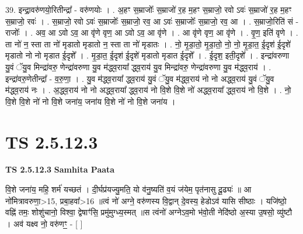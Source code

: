 \documentclass[17pt]{extarticle}
\begin{document}
39. इन्द्रा॒वरु॑णयो॒रितीन्द्रा᳚ - वरु॑णयोः । . अ॒हꣳ स॒म्राजोः᳚ स॒म्राजो॑ र॒ह म॒हꣳ स॒म्राजो॒ रवो ऽवः॑ स॒म्राजो॑ र॒ह म॒हꣳ स॒म्राजो॒ रवः॑ । . स॒म्राजो॒ रवो ऽवः॑ स॒म्राजोः᳚ स॒म्राजो॒ रव॒ आ ऽवः॑ स॒म्राजोः᳚ स॒म्राजो॒ रव॒ आ । . स॒म्राजो॒रिति॑ सं - राजोः᳚ । . अव॒ आ ऽवो ऽव॒ आ वृ॑णे वृण॒ आ ऽवो ऽव॒ आ वृ॑णे । . आ वृ॑णे वृण॒ आ वृ॑णे । . वृ॒ण॒ इति॑ वृणे । . ता नो॑ न॒ स्ता ता नो॑ मृडातो मृडातो न॒ स्ता ता नो॑ मृडातः । . नो॒ मृ॒डा॒तो॒ मृ॒डा॒तो॒ नो॒ नो॒ मृ॒डा॒त॒ ई॒दृश॑ ई॒दृशे॑ मृडातो नो नो मृडात ई॒दृशे᳚ । . मृ॒डा॒त॒ ई॒दृश॑ ई॒दृशे॑ मृडातो मृडात ई॒दृशे᳚ । . ई॒दृश॒ इती॒दृशे᳚ । . इन्द्रा॑वरुणा यु॒वं ॅयु॒व मिन्द्रा॑वरु॒ णेन्द्रा॑वरुणा यु॒व म॑द्ध्व॒राया᳚ द्ध्व॒राय॑ यु॒व मिन्द्रा॑वरु॒ णेन्द्रा॑वरुणा यु॒व म॑द्ध्व॒राय॑ । . इन्द्रा॑वरु॒णेतीन्द्रा᳚ - व॒रु॒णा॒ । . यु॒व म॑द्ध्व॒राया᳚ द्ध्व॒राय॑ यु॒वं ॅयु॒व म॑द्ध्व॒राय॑ नो नो अद्ध्व॒राय॑ यु॒वं ॅयु॒व म॑द्ध्व॒राय॑ नः । . अ॒द्ध्व॒राय॑ नो नो अद्ध्व॒राया᳚ द्ध्व॒राय॑ नो वि॒शे वि॒शे नो॑ अद्ध्व॒राया᳚ द्ध्व॒राय॑ नो वि॒शे । . नो॒ वि॒शे वि॒शे नो॑ नो वि॒शे जना॑य॒ जना॑य वि॒शे नो॑ नो वि॒शे जना॑य । \newline
\pagebreak
{}

\section{ TS 2.5.12.3 }

\textbf{TS 2.5.12.3 } \newline
\textbf{Samhita Paata} \newline

वि॒शे जना॑य॒ महि॒ शर्म॑ यच्छतं । दी॒र्घप्र॑यज्यु॒मति॒ यो व॑नु॒ष्यति॑ व॒यं ज॑येम॒ पृत॑नासु दू॒ढ्यः॑ ॥ आ नो॑मित्रावरुणा॒>15, प्रबा॒हवा᳚>16 ॥त्वं नो॑ अग्ने॒ वरु॑णस्य वि॒द्वान् दे॒वस्य॒ हेडोऽव॑ यासि सीष्ठाः । यजि॑ष्ठो॒ वह्नि॑ तमः॒ शोशु॑चानो॒ विश्वा॒ द्वेषाꣳ॑सि॒ प्रमु॑मुग्ध्य॒स्मत् ॥स त्वंनो॑ अग्नेऽव॒मो भ॑वो॒ती नेदि॑ष्ठो अ॒स्या उ॒षसो॒ व्यु॑ष्टौ । अव॑ यक्ष्व नो॒ वरु॑णꣳ॒॒ - [  ] \newline
\end{document}

